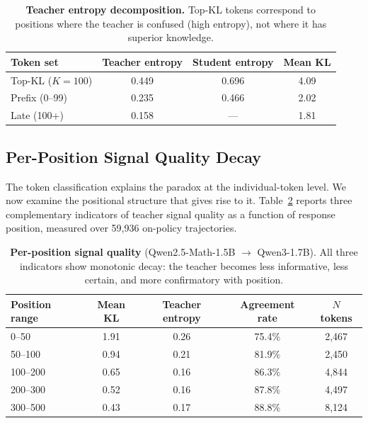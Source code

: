 \begin{table}[t]
\centering
\caption{\textbf{Teacher entropy decomposition.} Top-KL tokens correspond to positions where the teacher is confused (high entropy), not where it has superior knowledge.}
\label{tab:entropy_decomposition}
\small
\begin{tabular}{@{}lccc@{}}
\toprule
Token set & Teacher entropy & Student entropy & Mean KL \\
\midrule
Top-KL ($K{=}100$) & 0.449 & 0.696 & 4.09 \\
Prefix (0--99) & 0.235 & 0.466 & 2.02 \\
Late (100+) & 0.158 & --- & 1.81 \\
\bottomrule
\end{tabular}
\end{table}

\subsection{Per-Position Signal Quality Decay}
\label{sec:signal_decay}

The token classification explains the paradox at the individual-token level.
We now examine the positional structure that gives rise to it.
Table~\ref{tab:signal_decay} reports three complementary indicators of teacher signal quality as a function of response position, measured over 59{,}936 on-policy trajectories.

\begin{table}[t]
\centering
\caption{\textbf{Per-position signal quality} (Qwen2.5-Math-1.5B $\to$ Qwen3-1.7B). All three indicators show monotonic decay: the teacher becomes less informative, less certain, and more confirmatory with position.}
\label{tab:signal_decay}
\small
\begin{tabular}{@{}lcccc@{}}
\toprule
Position range & Mean KL & Teacher entropy & Agreement rate & $N$ tokens \\
\midrule
0--50      & 1.91 & 0.26 & 75.4\% & 2{,}467 \\
50--100    & 0.94 & 0.21 & 81.9\% & 2{,}450 \\
100--200   & 0.65 & 0.16 & 86.3\% & 4{,}844 \\
200--300   & 0.52 & 0.16 & 87.8\% & 4{,}497 \\
300--500   & 0.43 & 0.17 & 88.8\% & 8{,}124 \\
\bottomrule
\end{tabular}
\end{table}

